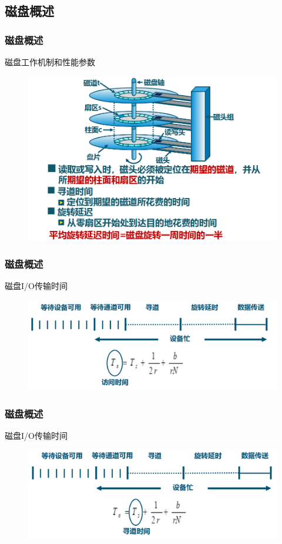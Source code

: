 \subsection{磁盘概述} %
\begin{frame}[fragile]
    \frametitle{磁盘概述}
    磁盘工作机制和性能参数
    \begin{figure}
    \includegraphics[width=0.57\linewidth]{figs/disk.png}
    \end{figure}
\end{frame}

\begin{frame}[fragile]
    \frametitle{磁盘概述}
    磁盘I/O传输时间
    \begin{figure}
        \includegraphics[width=0.8\linewidth]{figs/disk-time1.png}
    \end{figure}
\end{frame}

\begin{frame}[fragile]
    \frametitle{磁盘概述}
    磁盘I/O传输时间
    \begin{figure}
        \includegraphics[width=0.8\linewidth]{figs/disk-time2.png}
    \end{figure}
\end{frame}

